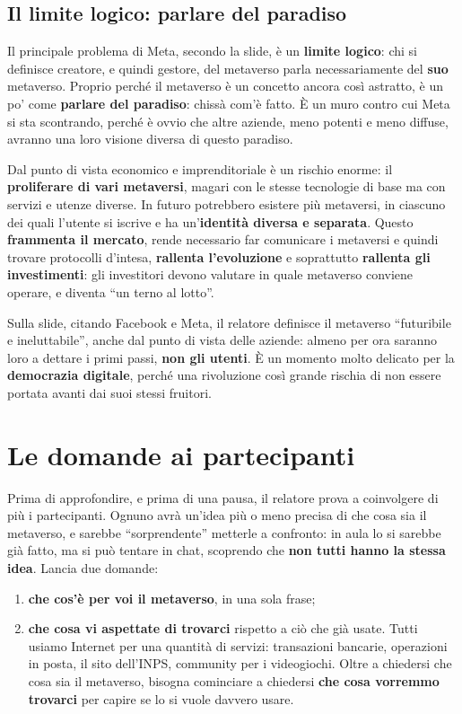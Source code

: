\subsection{Il limite logico: parlare del paradiso}

Il principale problema di Meta, secondo la slide, è un \textbf{limite logico}:
chi si definisce creatore, e quindi gestore, del metaverso parla
necessariamente del \textbf{suo} metaverso. Proprio perché il metaverso è un
concetto ancora così astratto, è un po' come \textbf{parlare del paradiso}:
chissà com'è fatto. È un muro contro cui Meta si sta scontrando, perché è ovvio
che altre aziende, meno potenti e meno diffuse, avranno una loro visione diversa
di questo paradiso.

Dal punto di vista economico e imprenditoriale è un rischio enorme: il
\textbf{proliferare di vari metaversi}, magari con le stesse tecnologie di base
ma con servizi e utenze diverse. In futuro potrebbero esistere più metaversi, in
ciascuno dei quali l'utente si iscrive e ha un'\textbf{identità diversa e
separata}. Questo \textbf{frammenta il mercato}, rende necessario far comunicare
i metaversi e quindi trovare protocolli d'intesa, \textbf{rallenta l'evoluzione}
e soprattutto \textbf{rallenta gli investimenti}: gli investitori devono valutare
in quale metaverso conviene operare, e diventa ``un terno al lotto''.

Sulla slide, citando Facebook e Meta, il relatore definisce il metaverso
``futuribile e ineluttabile'', anche dal punto di vista delle aziende: almeno per
ora saranno loro a dettare i primi passi, \textbf{non gli utenti}. È un momento
molto delicato per la \textbf{democrazia digitale}, perché una rivoluzione così
grande rischia di non essere portata avanti dai suoi stessi fruitori.

\section{Le domande ai partecipanti}
\label{z8:sec:domande}

Prima di approfondire, e prima di una pausa, il relatore prova a coinvolgere di
più i partecipanti. Ognuno avrà un'idea più o meno precisa di che cosa sia il
metaverso, e sarebbe ``sorprendente'' metterle a confronto: in aula lo si
sarebbe già fatto, ma si può tentare in chat, scoprendo che \textbf{non tutti
hanno la stessa idea}. Lancia due domande:
\begin{enumerate}
  \item \textbf{che cos'è per voi il metaverso}, in una sola frase;
  \item \textbf{che cosa vi aspettate di trovarci} rispetto a ciò che già usate.
        Tutti usiamo Internet per una quantità di servizi: transazioni bancarie,
        operazioni in posta, il sito dell'INPS, community per i videogiochi.
        Oltre a chiedersi che cosa sia il metaverso, bisogna cominciare a
        chiedersi \textbf{che cosa vorremmo trovarci} per capire se lo si vuole
        davvero usare.
\end{enumerate}

